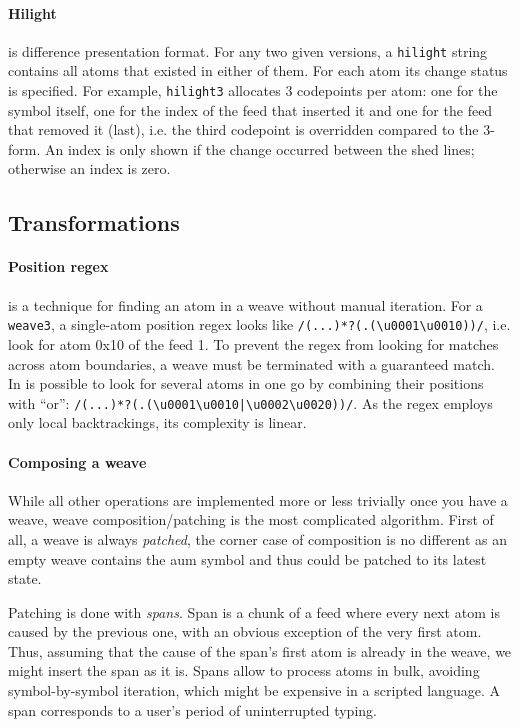 \documentclass{acm_proc_article-sp}
\begin{document}
\paragraph{Hilight} is difference presentation format. For any two given versions, a {\tt hilight} string contains all atoms that existed in either of them. For each atom its change status is specified.  For example, {\tt hilight3} allocates 3 codepoints per atom: one for the symbol itself, one for the index of the feed that inserted it and one for the feed that removed it (last), i.e. the third codepoint is overridden compared to the 3-form. An index is only shown if the change occurred between the shed lines; otherwise an index is zero.

\subsection {Transformations}


\paragraph{Position regex} is a technique for finding an atom in a weave without manual iteration. For a {\tt weave3}, a single-atom position regex looks like \verb+/(...)*?(.(\u0001\u0010))/+, i.e. look for atom 0x10 of the feed 1. To prevent the regex from looking for matches across atom boundaries, a weave must be terminated with a guaranteed match. In is possible to look for several atoms in one go by combining their positions with ``or'': \verb+/(...)*?(.(\u0001\u0010|\u0002\u0020))/+. As the regex employs only local backtrackings, its complexity is linear.

\paragraph{Composing a weave}

While all other operations are implemented more or less trivially once you have a weave, weave composition/patching is the most complicated algorithm. First of all, a weave is always \emph{patched}, the corner case of composition is no different as an empty weave contains the aum symbol and thus could be patched to its latest state.

Patching is done with \emph{spans}. Span is a chunk of a feed where every next atom is caused by the previous one, with an obvious exception of the very first atom. Thus, assuming that the cause of the span's first atom is already in the weave, we might insert the span as it is.
Spans allow to process atoms in bulk, avoiding symbol-by-symbol iteration, which might be expensive in a scripted language. A span corresponds to a user's period of uninterrupted typing.
\end{document}
